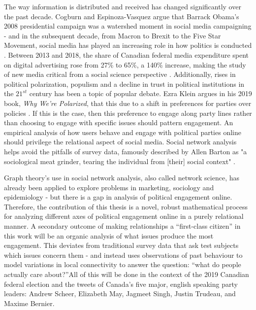 The way information is distributed and received has changed significantly over
the past decade. Cogburn and Espinoza-Vasquez argue that Barrack Obama’s 2008
presidential campaign was a watershed moment in social media campaigning - and
in the subsequent decade, from Macron to Brexit to the Five Star Movement,
social media has played an increasing role in how politics is conducted
\cite{cogburn2011networked}. Between 2013 and 2018, the share of Canadian
federal media expenditure spent on digital advertising rose from 27\% to 65\%, a
140\% increase, making the study of new media critical from a social science
perspective \cite{annualReportCanadaAdvertisingActivities_2018}. Additionally,
rises in political polarization, populism and a decline in trust in political
institutions in the $21^{st}$ century has been a topic of popular debate. Ezra
Klein argues in his 2019 book, \emph{Why We're Polarized}, that this due to a
shift in preferences for parties over policies \cite{levitsky2018democracies}.
If this is the case, then this preference to engage along party lines rather
than choosing to engage with specific issues should pattern engagement. An
empirical analysis of how users behave and engage with political parties online
should privilege the relational aspect of social media. Social network analysis
helps avoid the pitfalls of survey data, famously described by Allen Barton as
"a sociological meat grinder, tearing the individual from [their] social
context" \cite{freeman2004development}.

Graph theory’s use in social network analysis, also called network science, has
already been applied to explore problems in marketing, sociology and
epidemiology - but there is a gap in analysis of political engagement online.
Therefore, the contribution of this thesis is a novel, robust mathematical
process for analyzing different axes of political engagement online in a purely
relational manner. A secondary outcome of making relationships a “first-class
citizen” in this work will be an organic analysis of what issues produce the
most engagement. This deviates from traditional survey data that ask test
subjects which issues concern them - and instead uses observations of past
behaviour to model variations in local connectivity to answer the question:
“what do people actually care about?”All of this will be done in the context of
the 2019 Canadian federal election and the tweets of Canada's five major,
english speaking party leaders: Andrew Scheer, Elizabeth May, Jagmeet Singh,
Justin Trudeau, and Maxime Bernier. 

